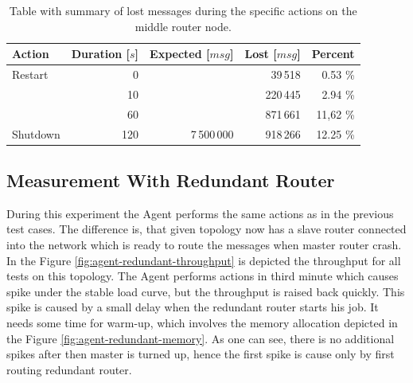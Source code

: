 \begingroup
\setlength{\tabcolsep}{10pt} %
\renewcommand{\arraystretch}{1.35} %
	\begin{table}[H]
	\centering
	\caption{Table with summary of lost messages during the specific actions on the middle router node.}
	\label{tab:agent_demonstration}
	\begin{tabular}{|l|r|r|r|r|}
	\hline
	\rowcolor[HTML]{C5E3DF}
	\textbf{Action} & \textbf{Duration [$s$]} & \textbf{Expected [$msg$]} & \textbf{Lost [$msg$]} & \textbf{Percent} \\ \hline
	Restart & 0 & & 39\,518 & 0.53 \% \\ \cline{1-2} \cline{4-5}
	 & 10 & & 220\,445 & 2.94 \% \\ \cline{2-2} \cline{4-5}
	 & 60 & & 871\,661 & 11,62 \% \\ \cline{2-2} \cline{4-5}
	\multirow{-3}{*}{Shutdown} & 120 & \multirow{-4}{*}{7\,500\,000} & 918\,266 & 12.25 \% \\ \hline
	\end{tabular}
	\end{table}
\endgroup


\subsection{Measurement With Redundant Router}
During this experiment the Agent performs the same actions as in the previous test cases. The difference is, that given topology now has a slave router connected into the network which is ready to route the messages when master router crash. In the Figure \ref{fig:agent-redundant-throughput} is depicted the throughput for all tests on this topology. The Agent performs actions in third minute which causes spike under the stable load curve, but the throughput is raised back quickly. This spike is caused by a small delay when the redundant router starts his job. It needs some time for warm-up, which involves the memory allocation depicted in the Figure \ref{fig:agent-redundant-memory}. As one can see, there is no additional spikes after then master is turned up, hence the first spike is cause only by first routing redundant router.


